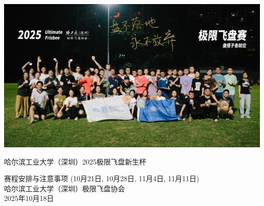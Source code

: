 \documentclass{ctexart}
\begin{document}
\begin{titlepage}
    \thispagestyle{empty} %
    \vspace*{-1.15in} %
    \noindent\hspace*{-1in}%
    \includegraphics[width=\paperwidth, height=0.4\paperheight, keepaspectratio]{大合照.jpg}%

    \vspace{-1pt} %
    \noindent\hspace*{-1in}%
    \colorbox{MyBannerTeal}{%
        \begin{minipage}[c][2em][c]{\dimexpr\paperwidth-2\fboxsep\relax} %
            \hspace{0pt} %
        \end{minipage}%
    }

    \begin{center}
        \vspace{4em} %
        {\LARGE 哈尔滨工业大学（深圳）2025极限飞盘新生杯\par} %
        
        \vspace{1.5em} %
        {\Large 赛程安排与注意事项 (10月21日, 10月28日, 11月4日, 11月11日)} \\[2em] %
        
        {哈尔滨工业大学（深圳）极限飞盘协会} \\[1em]
        {2025年10月18日}\par


\end{center}
\end{titlepage}
\end{document}
